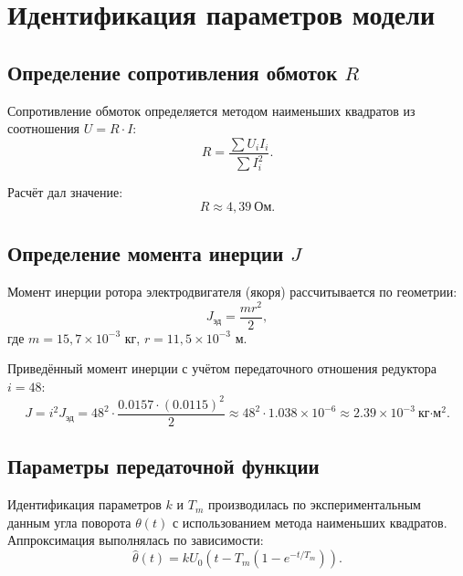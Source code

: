 \documentclass[a4paper, 12pt]{article}
\begin{document}
\section{Идентификация параметров модели}

\subsection{Определение сопротивления обмоток $R$}

Сопротивление обмоток определяется методом наименьших квадратов из соотношения $U = R \cdot I$:
\begin{equation}
    R = \frac{\sum U_i I_i}{\sum I_i^2}.
\end{equation}

Расчёт дал значение:
\begin{equation}
    R \approx 4{,}39~\text{Ом}.
\end{equation}

\subsection{Определение момента инерции $J$}

Момент инерции ротора электродвигателя (якоря) рассчитывается по геометрии:
\begin{equation}
    J_{\text{эд}} = \frac{m r^2}{2},
\end{equation}
где $m = 15{,}7 \times 10^{-3}$ кг, $r = 11{,}5 \times 10^{-3}$ м.

Приведённый момент инерции с учётом передаточного отношения редуктора $i = 48$:
\begin{equation}
    J = i^2 J_{\text{эд}} = 48^2 \cdot \frac{0.0157 \cdot (0.0115)^2}{2} \approx 48^2 \cdot 1.038 \times 10^{-6} \approx 2.39 \times 10^{-3}~\text{кг·м}^2.
\end{equation}

\subsection{Параметры передаточной функции}

Идентификация параметров $k$ и $T_m$ производилась по экспериментальным данным угла поворота $\theta(t)$ с использованием метода наименьших квадратов. Аппроксимация выполнялась по зависимости:
\begin{equation}
    \hat{\theta}(t) = k U_0 \left( t - T_m (1 - e^{-t/T_m}) \right).
\end{equation}
\end{document}

